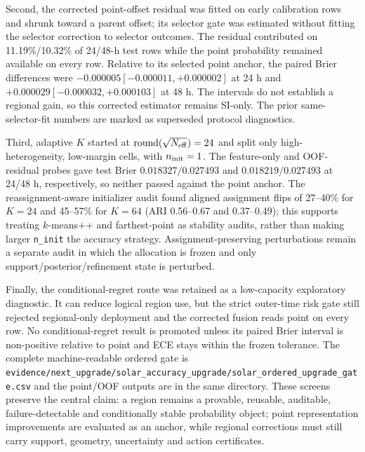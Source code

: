\documentclass[11pt,a4paper]{article}
\numberwithin{equation}{section}
\theoremstyle{definition}\newtheorem{definition}[theorem]{Definition}
\theoremstyle{remark}\newtheorem{remark}[theorem]{Remark}
\begin{document}
Second, the corrected point-offset residual was fitted on early calibration rows and shrunk toward a parent offset; its selector gate was estimated without fitting the selector correction to selector outcomes. The residual contributed on 11.19\%/10.32\% of 24/48-h test rows while the point probability remained available on every row. Relative to its selected point anchor, the paired Brier differences were $-0.000005[-0.000011,+0.000002]$ at 24 h and $+0.000029[-0.000032,+0.000103]$ at 48 h. The intervals do not establish a regional gain, so this corrected estimator remains SI-only. The prior same-selector-fit numbers are marked as superseded protocol diagnostics.

Third, adaptive $K$ started at $\operatorname{round}(\sqrt{N_{\rm eff}})=24$ and split only high-heterogeneity, low-margin cells, with $n_{\rm init}=1$. The feature-only and OOF-residual probes gave test Brier $0.018327/0.027493$ and $0.018219/0.027493$ at 24/48 h, respectively, so neither passed against the point anchor. The reassignment-aware initializer audit found aligned assignment flips of 27--40\% for $K=24$ and 45--57\% for $K=64$ (ARI 0.56--0.67 and 0.37--0.49); this supports treating $k$-means++ and farthest-point as stability audits, rather than making larger \texttt{n\_init} the accuracy strategy. Assignment-preserving perturbations remain a separate audit in which the allocation is frozen and only support/posterior/refinement state is perturbed.

Finally, the conditional-regret route was retained as a low-capacity exploratory diagnostic. It can reduce logical region use, but the strict outer-time risk gate still rejected regional-only deployment and the corrected fusion reads point on every row. No conditional-regret result is promoted unless its paired Brier interval is non-positive relative to point and ECE stays within the frozen tolerance. The complete machine-readable ordered gate is \texttt{evidence/next\_upgrade/solar\_accuracy\_upgrade/solar\_ordered\_upgrade\_gate.csv} and the point/OOF outputs are in the same directory. These screens preserve the central claim: a region remains a provable, reusable, auditable, failure-detectable and conditionally stable probability object; point representation improvements are evaluated as an anchor, while regional corrections must still carry support, geometry, uncertainty and action certificates.
\end{document}
